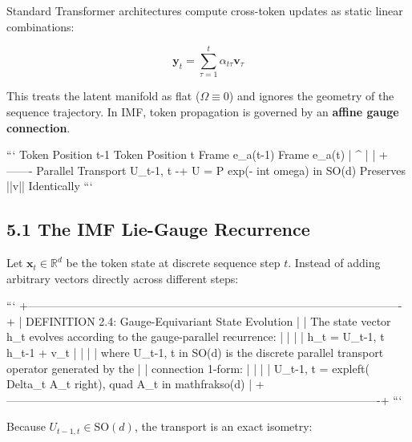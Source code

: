 \documentclass[11pt,twoside,openright]{amsbook}
\begin{document}
{{{{{{Standard Transformer architectures compute cross-token updates as static linear combinations:

$$\mathbf{y}_t = \sum_{\tau=1}^t \alpha_{t\tau} \mathbf{v}_\tau$$

This treats the latent manifold as flat ($\Omega \equiv 0$) and ignores the geometry of the sequence trajectory. In IMF, token propagation is governed by an \textbf{affine gauge connection}.

```
Token Position t-1                      Token Position t
Frame {e_a(t-1)}                        Frame {e_a(t)}
        |                                       ^
        |                                       |
        +------- Parallel Transport U_{t-1, t} -+
                 U = P exp(- int omega) in SO(d)
                 Preserves ||v|| Identically
```

\subsection{5.1 The IMF Lie-Gauge Recurrence}

Let $\mathbf{x}_t \in \mathbb{R}^d$ be the token state at discrete sequence step $t$. Instead of adding arbitrary vectors directly across different steps:

```
+----------------------------------------------------------------------------------------------------+
| DEFINITION 2.4: Gauge-Equivariant State Evolution                                                  |
| The state vector h_t evolves according to the gauge-parallel recurrence:                           |
|                                                                                                    |
|   h_t = U_{t-1, t} h_{t-1} + v_t                                                                   |
|                                                                                                    |
| where U_{t-1, t} in SO(d) is the discrete parallel transport operator generated by the             |
| connection 1-form:                                                                                 |
|                                                                                                    |
|   U_{t-1, t} = expleft( Delta_t A_t right), quad A_t in mathfrak{so}(d)                             |
+----------------------------------------------------------------------------------------------------+
```

Because $U_{t-1, t} \in \mathrm{SO}(d)$, the transport is an exact isometry:

}}}}}}
\end{document}
